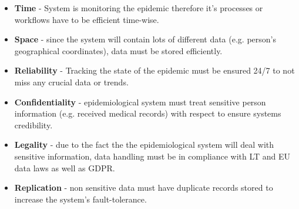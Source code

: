 \documentclass{VUMIFPSkursinis}
\begin{document}
	\begin{itemize}
		\item{\textbf{Time} - System is monitoring the epidemic therefore it's processes or workflows have to be efficient time-wise.}
		\item{\textbf{Space} - since the system will contain lots of different data (e.g. person's geographical coordinates), data must be stored efficiently.}		
		\item{\textbf{Reliability} - Tracking the state of the epidemic must be ensured 24/7 to not miss any crucial data or trends.}
		\item{\textbf{Confidentiality} - epidemiological system must treat sensitive person information (e.g. received medical records) with respect to ensure systems credibility.}
		\item {\textbf{Legality} - due to the fact the the epidemiological system will deal with sensitive information, data handling must be in compliance with LT and EU data laws as well as GDPR.}
		\item{\textbf{Replication} - non sensitive data must have duplicate records stored to increase the system's fault-tolerance.}
	\end{itemize}
\end{document}
